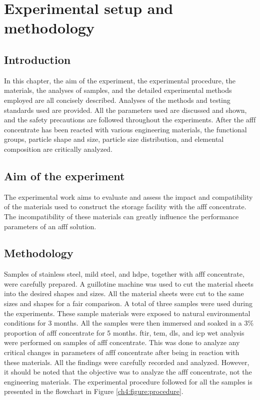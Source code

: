 \chapter{Experimental setup and methodology}
\section{Introduction}
In this chapter, the aim of the experiment, the experimental procedure, the materials, the analyses of samples, and the detailed experimental methods employed are all concisely described. Analyses of the methods and testing standards used are provided. All the parameters used are discussed and shown, and the safety precautions are followed throughout the experiments. After the \acrshort{afff} concentrate has been reacted with various engineering materials, the functional groups, particle shape and size, particle size distribution, and elemental composition are critically analyzed.

\section{Aim of the experiment}
The experimental work aims to evaluate and assess the impact and compatibility of the materials used to construct the storage facility with the \acrshort{afff} concentrate. The incompatibility of these materials can greatly influence the performance parameters of an \acrshort{afff} solution.

\section{Methodology}
Samples of stainless steel, mild steel, and \acrshort{hdpe}, together with \acrshort{afff} concentrate, were carefully prepared. A guillotine machine was used to cut the material sheets into the desired shapes and sizes. All the material sheets were cut to the same sizes and shapes for a fair comparison. A total of three samples were used during the experiments. These sample materials were exposed to natural environmental conditions for 3 months. All the samples were then immersed and soaked in a 3\% proportion of \acrshort{afff} concentrate for 5 months. \acrfull{ftir}, \acrfull{tem}, \acrfull{dls}, and \acrfull{icp} wet analysis were performed on samples of \acrshort{afff} concentrate. This was done to analyze any critical changes in parameters of \acrshort{afff} concentrate after being in reaction with these materials. All the findings were carefully recorded and analyzed. However, it should be noted that the objective was to analyze the \acrshort{afff} concentrate, not the engineering materials. The experimental procedure followed for all the samples is presented in the flowchart in Figure \ref{ch4:figure:procedure}. 

